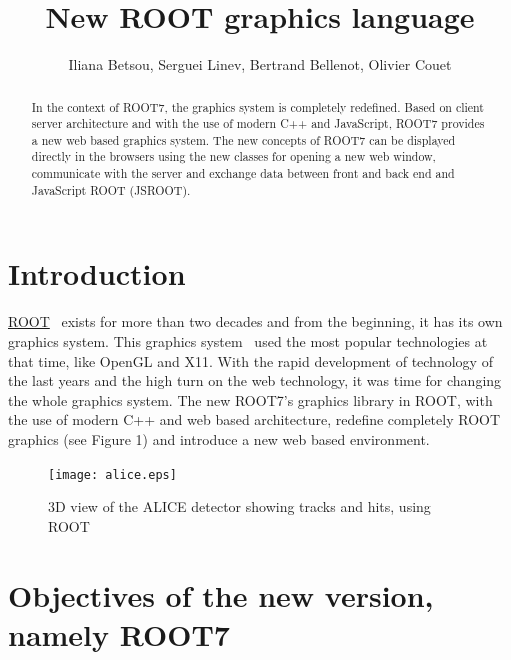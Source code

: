 \documentclass[a4paper]{jpconf}
\begin{document}
\title{New ROOT graphics language}

\author{Iliana Betsou, Serguei Linev, Bertrand Bellenot, Olivier Couet}

\address{Production Editor, \jpcs, \iopp, Dirac House, Temple Back, Bristol BS1~6BE, UK}


\begin{abstract}
In the context of ROOT7, the graphics system is completely redefined. Based on client
server architecture and with the use of modern C++ and JavaScript, ROOT7 provides a
new web based graphics system. The new concepts of ROOT7 can be displayed directly
in the browsers using the new classes for opening a new web window, communicate
with the server and exchange data between front and back end and JavaScript ROOT (JSROOT).
\end{abstract}

\section{Introduction}
\href{https://root.cern/}{ROOT}~\cite{root} exists for more than two decades and
from the beginning, it has its own graphics system. This graphics system~\cite{Antcheva:2011zz}
used the most popular technologies at that time, like OpenGL and X11. With the rapid development
of technology of the last years and the high turn on the web technology, it was time for
changing the whole graphics system. The new ROOT7's graphics library in ROOT, with the
use of modern C++ and web based architecture, redefine completely ROOT graphics (see Figure 1)
 and introduce a new web based environment.
\\
\begin{figure}[h]
  \begin{center}
    \texttt{[image: alice.eps]}\hspace{2pc}%
  \end{center}
\centering
\begin{minipage}[b]{25pc}\caption{\label{label}3D view of the ALICE detector showing tracks and hits, using ROOT}
\end{minipage}
\end{figure}


\section{Objectives of the new version, namely ROOT7}
\end{document}

